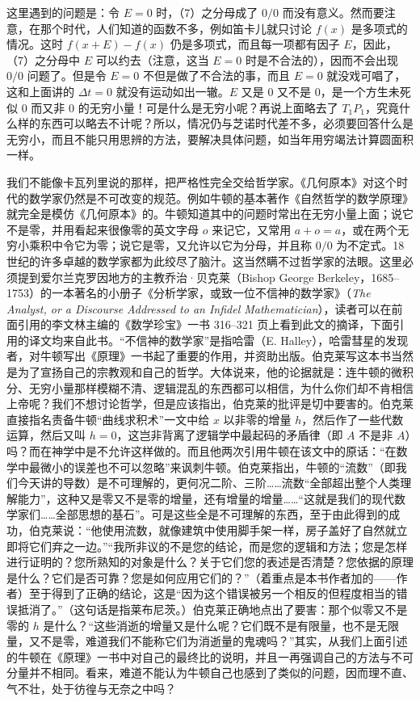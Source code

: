 这里遇到的问题是：令 $E=0$ 时，（7）之分母成了 $0/0$ 而没有意义。然而要注意，在那个时代，人们知道的函数不多，例如笛卡儿就只讨论 $f(x)$ 是多项式的情况。这时 $f(x+E)-f(x)$ 仍是多项式，而且每一项都有因子 $E$，因此，（7）之分母中 $E$ 可以约去（注意，这当 $E=0$ 时是不合法的），因而不会出现 $0/0$ 问题了。但是令 $E=0$ 不但是做了不合法的事，而且 $E=0$ 就没戏可唱了，这和上面讲的 $\Delta t=0$ 就没有运动如出一辙。$E$ 又是 $0$ 又不是 $0$，是一个方生未死似 $0$ 而又非 $0$ 的无穷小量！可是什么是无穷小呢？再说上面略去了 $T_1P_1$，究竟什么样的东西可以略去不计呢？所以，情况仍与芝诺时代差不多，必须要回答什么是无穷小，而且不能只用思辨的方法，要解决具体问题，如当年用穷竭法计算圆面积一样。

我们不能像卡瓦列里说的那样，把严格性完全交给哲学家。《几何原本》对这个时代的数学家仍然是不可改变的规范。例如牛顿的基本著作《自然哲学的数学原理》就完全是模仿《几何原本》的。牛顿知道其中的问题时常出在无穷小量上面；说它不是零，并用看起来很像零的英文字母 $o$ 来记它，又常用 $a+o=a$，或在两个无穷小乘积中令它为零；说它是零，又允许以它为分母，并且称 $0/0$ 为不定式。18 世纪的许多卓越的数学家都为此绞尽了脑汁。这当然瞒不过哲学家的法眼。这里必须提到爱尔兰克罗因地方的主教乔治·贝克莱（Bishop George Berkeley，1685--1753）的一本著名的小册子《分析学家，或致一位不信神的数学家》（\textit{The Analyst, or a Discourse Addressed to an Infidel Mathematician}），读者可以在前面引用的李文林主编的《数学珍宝》一书 316--321 页上看到此文的摘译，下面引用的译文均来自此书。“不信神的数学家”是指哈雷（E. Halley），哈雷彗星的发现者，对牛顿写出《原理》一书起了重要的作用，并资助出版。伯克莱写这本书当然是为了宣扬自己的宗教观和自己的哲学。大体说来，他的论据就是：连牛顿的微积分、无穷小量那样模糊不清、逻辑混乱的东西都可以相信，为什么你们却不肯相信上帝呢？我们不想讨论哲学，但是应该指出，伯克莱的批评是切中要害的。伯克莱直接指名责备牛顿“曲线求积术”一文中给 $x$ 以非零的增量 $h$，然后作了一些代数运算，然后又叫 $h=0$，这岂非背离了逻辑学中最起码的矛盾律（即 $A$ 不是非 $A$）吗？而在神学中是不允许这样做的。而且他两次引用牛顿在该文中的原话：“在数学中最微小的误差也不可以忽略”来讽刺牛顿。伯克莱指出，牛顿的“流数”（即我们今天讲的导数）是不可理解的，更何况二阶、三阶……流数“全部超出整个人类理解能力”，这种又是零又不是零的增量，还有增量的增量……“这就是我们的现代数学家们……全部思想的基石”。可是这些全是不可理解的东西，至于由此得到的成功，伯克莱说：“他使用流数，就像建筑中使用脚手架一样，房子盖好了自然就立即将它们弃之一边。”“我所非议的不是您的结论，而是您的逻辑和方法；您是怎样进行证明的？您所熟知的对象是什么？关于它们您的表述是否清楚？您依据的原理是什么？它们是否可靠？您是如何应用它们的？”（着重点是本书作者加的——作者）至于得到了正确的结论，这是“因为这个错误被另一个相反的但程度相当的错误抵消了。”（这句话是指莱布尼茨。）伯克莱正确地点出了要害：那个似零又不是零的 $h$ 是什么？“这些消逝的增量又是什么呢？它们既不是有限量，也不是无限量，又不是零，难道我们不能称它们为消逝量的鬼魂吗？”其实，从我们上面引述的牛顿在《原理》一书中对自己的最终比的说明，并且一再强调自己的方法与不可分量并不相同。看来，难道不能认为牛顿自己也感到了类似的问题，因而理不直、气不壮，处于彷徨与无奈之中吗？

